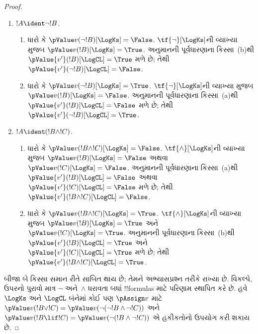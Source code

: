 \documentclass[../../../include/open-logic-section]{subfiles}
\begin{document}
\begin{proof}
\begin{enumerate}
    અનુમાનના પગલા માટે નીચેના કિસ્સા લો:
    \item $!A \ident \lnot !B$.
    \begin{enumerate}
      \item ધારો કે $\pValue v(\lnot!B)[\LogKs] = \False$.
      $\tf{\lnot}[\LogKs]$ની વ્યાખ્યા મુજબ
      $\pValue v(!B)[\LogKs] = \True$. અનુમાનની પૂર્વધારણાના
      કિસ્સા~(b)થી $\pValue {v'}(!B)[\LogCL] = \True$ મળે છે;
      તેથી $\pValue {v'}(\lnot !B)[\LogCL] = \False$.
      \item ધારો કે $\pValue v(\lnot!B)[\LogKs] = \True$.
      $\tf{\lnot}[\LogKs]$ની વ્યાખ્યા મુજબ
      $\pValue v(!B)[\LogKs] = \False$. અનુમાનની પૂર્વધારણાના
      કિસ્સા~(a)થી $\pValue {v'}(!B)[\LogCL] = \False$ મળે છે;
      તેથી $\pValue {v'}(\lnot !B)[\LogCL] = \True$.
    \end{enumerate}

    \item $!A \ident (!B \land !C)$.
    \begin{enumerate}
      \item ધારો કે $\pValue v(!B \land !C)[\LogKs] = \False$.
      $\tf{\land}[\LogKs]$ની વ્યાખ્યા મુજબ
      $\pValue v(!B)[\LogKs] = \False$ અથવા
      $\pValue v(!C)[\LogKs] = \False$. અનુમાનની પૂર્વધારણાના
      કિસ્સા~(a)થી $\pValue {v'}(!B)[\LogCL] = \False$
      અથવા $\pValue {v'}(!C)[\LogCL] = \False$ મળે છે; તેથી
      $\pValue {v'}(!B \land !C)[\LogCL] = \False$.
      \item ધારો કે $\pValue v(!B \land !C)[\LogKs] = \True$.
      $\tf{\land}[\LogKs]$ની વ્યાખ્યા મુજબ
      $\pValue v(!B)[\LogKs] = \True$ અને
      $\pValue v(!C)[\LogKs] = \True$. અનુમાનની પૂર્વધારણાના
      કિસ્સા~(b)થી $\pValue {v'}(!B)[\LogCL] = \True$
      અને $\pValue {v'}(!C)[\LogCL] = \True$ મળે છે; તેથી
      $\pValue {v'}(!B \land !C)[\LogCL] = \True$.
    \end{enumerate}
  \end{enumerate}

  બીજા બે કિસ્સા સમાન રીતે સાબિત થાય છે; તેમને અભ્યાસપ્રશ્ન તરીકે
  રાખ્યા છે. વિકલ્પે, ઉપરનો પુરાવો માત્ર $\lnot$ અને~$\land$
  ધરાવતા બધાં !!{formula}s માટે પરિણામ સ્થાપિત કરે છે. હવે
  $\LogKs$ અને $\LogCL$ બંનેમાં કોઈ પણ $\pAssign v$ માટે
  $\pValue v(!B \lor
  !C) = \pValue v(\lnot(\lnot!B \land \lnot !C))$ અને
  $\pValue v(!B \lif
  !C) = \pValue v(\lnot(!B \land \lnot !C))$ એ હકીકતોનો
  ઉપયોગ કરી શકાય છે.
\end{proof}
\end{document}
